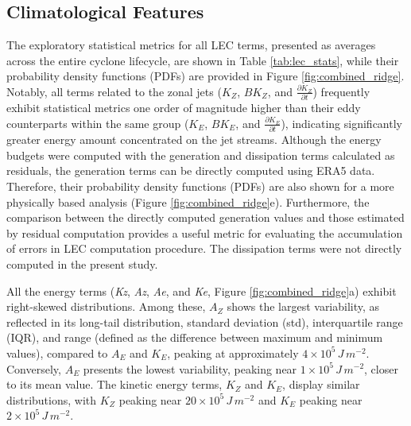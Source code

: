 \documentclass[pdflatex,sn-chicago]{sn-jnl}%
\theoremstyle{plain}
\theoremstyle{definition}
\theoremstyle{remark}
\theoremstyle{definition}
\begin{document}
\subsection{Climatological Features}\label{sec:climatology}

The exploratory statistical metrics for all LEC terms, presented as averages across the entire cyclone lifecycle, are shown in Table \ref{tab:lec_stats}, while their probability density functions (PDFs) are provided in Figure \ref{fig:combined_ridge}. Notably, all terms related to the zonal jets ($K_Z$, $BK_Z$, and \(\frac{\partial K_Z}{\partial t}\)) frequently exhibit statistical metrics one order of magnitude higher than their eddy counterparts within the same group ($K_E$, $BK_E$, and \(\frac{\partial K_E}{\partial t}\)), indicating significantly greater energy amount concentrated on the jet streams. Although the energy budgets were computed with the generation and dissipation terms calculated as residuals, the generation terms can be directly computed using ERA5 data. Therefore, their probability density functions (PDFs) are also shown for a more physically based analysis (Figure \ref{fig:combined_ridge}e). Furthermore, the comparison between the directly computed generation values and those estimated by residual computation provides a useful metric for evaluating the accumulation of errors in LEC computation procedure. The dissipation terms were not directly computed in the present study.


All the energy terms (\textit{Kz}, \textit{Az}, \textit{Ae}, and \textit{Ke}, Figure \ref{fig:combined_ridge}a) exhibit right-skewed distributions. Among these, $A_Z$ shows the largest variability, as reflected in its long-tail distribution, standard deviation (std), interquartile range (IQR), and range (defined as the difference between maximum and minimum values), compared to $A_E$ and $K_E$, peaking at approximately $4 \times 10^5 \, J \, m^{-2}$. Conversely, $A_E$ presents the lowest variability, peaking near $1 \times 10^5 \, J \, m^{-2}$, closer to its mean value. The kinetic energy terms, $K_Z$ and $K_E$, display similar distributions, with $K_Z$ peaking near $20 \times 10^5 \, J \, m^{-2}$ and $K_E$ peaking near $2 \times 10^5 \, J \, m^{-2}$.
\end{document}

